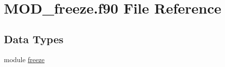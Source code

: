 \hypertarget{MOD__freeze_8f90}{\section{M\-O\-D\-\_\-freeze.\-f90 File Reference}
\label{MOD__freeze_8f90}
}
\subsection*{Data Types}
\begin{DoxyCompactItemize}
\item 
module \hyperlink{classfreeze}{freeze}
\end{DoxyCompactItemize}
